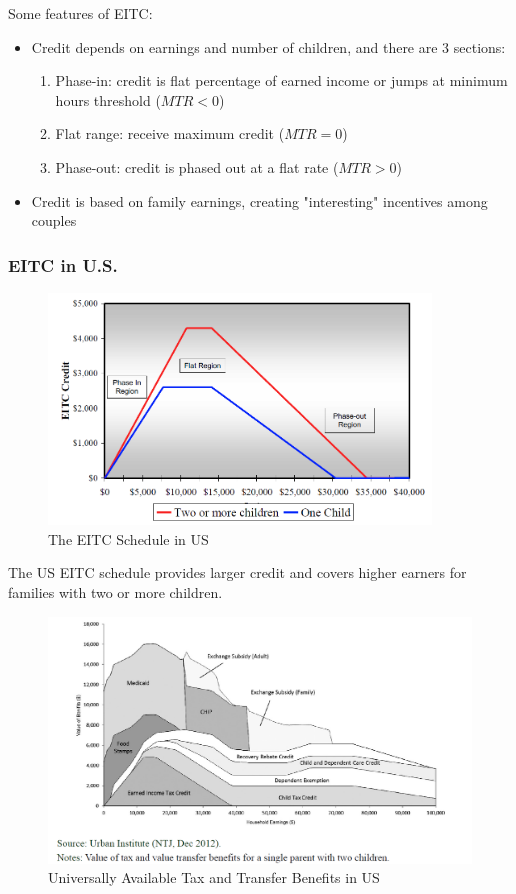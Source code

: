         Some features of EITC:
        \begin{itemize}
            \item Credit depends on earnings and number of children, and there are 3 sections:
            \begin{enumerate}
                \item Phase-in: credit is flat percentage of earned income or jumps at minimum hours threshold ($MTR<0$)
                \item Flat range: receive maximum credit ($MTR=0$)
                \item Phase-out: credit is phased out at a flat rate ($MTR>0$)
            \end{enumerate}
            \item Credit is based on family earnings, creating "interesting" incentives among couples
        \end{itemize}

        \subsubsection{EITC in U.S.}
        
            \begin{figure}[H]
                \centering
                \includegraphics[width=4in]{images/ch13/13_US_EITC_1.png}
                \caption{The EITC Schedule in US}
            \end{figure}
            The US EITC schedule provides larger credit and covers higher earners for families with two or more children.
    
            \begin{figure}[H]
                \centering
                \includegraphics[width=5in]{images/ch13/13_US_Tax_and_trans.png}
                \caption{Universally Available Tax and Transfer Benefits in US}
            \end{figure}
    
